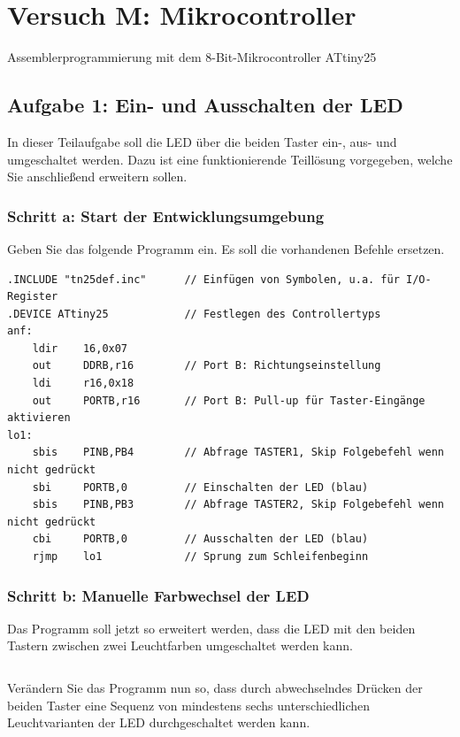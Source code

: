 \documentclass[a4paper,12pt,titlepage]{scrartcl}
\begin{document}
\newpage
\section*{Versuch M: Mikrocontroller}
Assemblerprogrammierung mit dem 8-Bit-Mikrocontroller ATtiny25

\subsection*{Aufgabe 1: Ein- und Ausschalten der LED}
In dieser Teilaufgabe soll die LED über die beiden Taster ein-, aus- und umgeschaltet werden. Dazu
ist eine funktionierende Teillösung vorgegeben, welche Sie anschließend erweitern sollen.

\subsubsection*{Schritt a: Start der Entwicklungsumgebung}
Geben Sie das folgende Programm ein. Es soll die vorhandenen Befehle ersetzen.
\begin{lstlisting}[basicstyle=\tiny]
.INCLUDE "tn25def.inc"      // Einfügen von Symbolen, u.a. für I/O-Register
.DEVICE ATtiny25            // Festlegen des Controllertyps
anf:
    ldir    16,0x07
    out     DDRB,r16        // Port B: Richtungseinstellung
    ldi     r16,0x18
    out     PORTB,r16       // Port B: Pull-up für Taster-Eingänge aktivieren
lo1:
    sbis    PINB,PB4        // Abfrage TASTER1, Skip Folgebefehl wenn nicht gedrückt
    sbi     PORTB,0         // Einschalten der LED (blau)
    sbis    PINB,PB3        // Abfrage TASTER2, Skip Folgebefehl wenn nicht gedrückt
    cbi     PORTB,0         // Ausschalten der LED (blau)
    rjmp    lo1             // Sprung zum Schleifenbeginn
\end{lstlisting}

\subsubsection*{Schritt b: Manuelle Farbwechsel der LED}
Das Programm soll jetzt so erweitert werden, dass die LED mit den beiden Tastern zwischen zwei Leuchtfarben umgeschaltet werden kann.
\begin{lstlisting}[basicstyle=\tiny]
\end{lstlisting}

Verändern Sie das Programm nun so, dass durch abwechselndes Drücken der beiden Taster eine Sequenz von mindestens sechs unterschiedlichen Leuchtvarianten der LED durchgeschaltet werden kann.
\begin{lstlisting}[basicstyle=\tiny]
\end{lstlisting}
\end{document}

